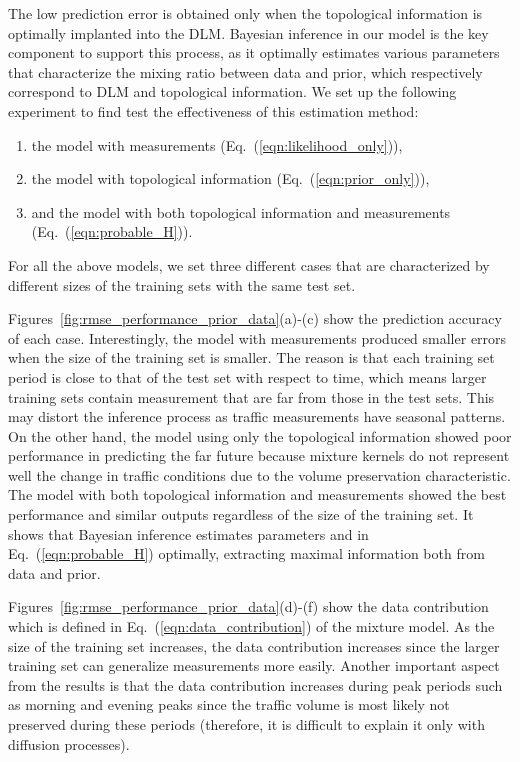 \documentclass[journal]{IEEEtran}
\begin{document}
The low prediction error is obtained only when the topological information is optimally implanted into the DLM. Bayesian inference in our model is the key component to support this process, as it optimally estimates various parameters that characterize the mixing ratio between data and prior, which respectively correspond to DLM and topological information. We set up the following experiment to find test the effectiveness of this estimation method:
\begin{enumerate}
\item the model with measurements (Eq.~(\ref{eqn:likelihood_only})),
\item the model with topological information (Eq.~(\ref{eqn:prior_only})),
\item and the model with both topological information and measurements (Eq.~(\ref{eqn:probable_H})).
\end{enumerate}
For all the above models, we set three different cases that are characterized by different sizes of the training sets with the same test set.



Figures~\ref{fig:rmse_performance_prior_data}(a)-(c) show the prediction accuracy of each case. Interestingly, the model with measurements produced smaller errors when the size of the training set is smaller.
The reason is that each training set period is close to that of the test set with respect to time, which means larger training sets contain measurement that are far from those in the test sets. This may distort the inference process as traffic measurements have seasonal patterns.
On the other hand, the model using only the topological information showed poor performance in predicting the far future because mixture kernels do not represent well the change in traffic conditions due to the volume preservation characteristic.
The model with both topological information and measurements showed the best performance and similar outputs regardless of the size of the training set. 
It shows that Bayesian inference estimates parameters  and  in Eq.~(\ref{eqn:probable_H}) optimally, extracting maximal information both from data and prior.

Figures~\ref{fig:rmse_performance_prior_data}(d)-(f) show the data contribution which is defined in Eq.~(\ref{eqn:data_contribution}) of the mixture model. As the size of the training set increases, the data contribution increases since the larger training set can generalize measurements more easily. Another important aspect from the results is that the data contribution increases during peak periods such as morning and evening peaks since the traffic volume is most likely not preserved during these periods (therefore, it is difficult to explain it only with diffusion processes). 
\end{document}
